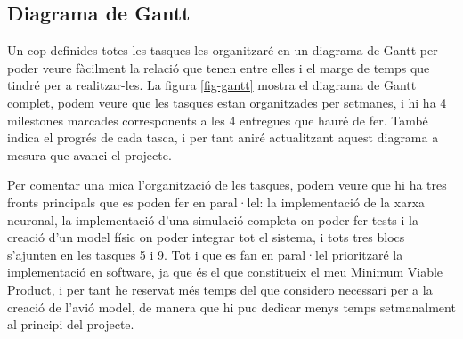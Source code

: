 \documentclass[10pt,a4paper,twocolumn,twoside]{article}
\begin{document}
\subsection{Diagrama de Gantt}

Un cop definides totes les tasques les organitzaré en un diagrama de Gantt per poder veure fàcilment la relació que tenen entre elles i el marge de temps que tindré per a realitzar-les.  La figura \ref{fig-gantt} mostra el diagrama de Gantt complet, podem veure que les tasques estan organitzades per setmanes, i hi ha 4 milestones marcades corresponents a les 4 entregues que hauré de fer. També indica el progrés de cada tasca, i per tant aniré actualitzant aquest diagrama a mesura que avanci el projecte.

Per comentar una mica l'organització de les tasques, podem veure que hi ha tres fronts principals que es poden fer en paral·lel: la implementació de la xarxa neuronal, la implementació d'una simulació completa on poder fer tests i la creació d'un model físic on poder integrar tot el sistema, i tots tres blocs s'ajunten en les tasques 5 i 9. Tot i que es fan en paral·lel prioritzaré la implementació en software, ja que és el que constitueix el meu Minimum Viable Product, i per tant he reservat més temps del que considero necessari per a la creació de l'avió model, de manera que hi puc dedicar menys temps setmanalment al principi del projecte.
\end{document}

